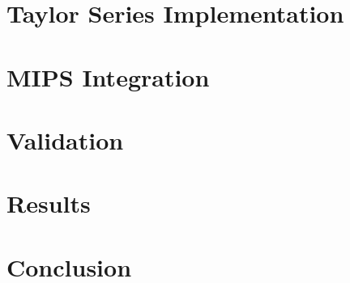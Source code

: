 \documentclass[10pt,journal]{IEEEtran}
\begin{document}
\section{Taylor Series Implementation}

\section{MIPS Integration}

\section{Validation}

\section{Results}

\section{Conclusion}
\end{document}
